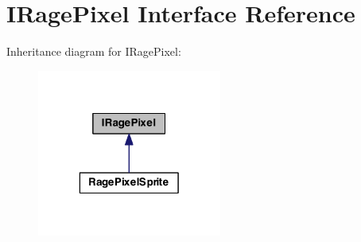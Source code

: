 \hypertarget{interface_i_rage_pixel}{\section{I\-Rage\-Pixel Interface Reference}
\label{interface_i_rage_pixel}
}


Inheritance diagram for I\-Rage\-Pixel\-:
\nopagebreak
\begin{figure}[H]
\begin{center}
\leavevmode
\includegraphics[width=172pt]{interface_i_rage_pixel__inherit__graph}
\end{center}
\end{figure}

